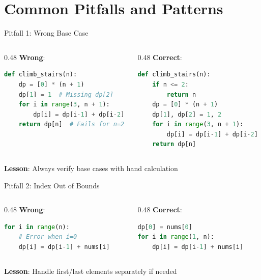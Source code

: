 \documentclass[aspectratio=169]{beamer}
\begin{document}
\section{Common Pitfalls and Patterns}

\begin{frame}[fragile]{Pitfall 1: Wrong Base Case}
\begin{columns}
\begin{column}{0.48\textwidth}
\textbf{Wrong}:
\begin{lstlisting}[language=Python, basicstyle=\ttfamily\tiny]
def climb_stairs(n):
    dp = [0] * (n + 1)
    dp[1] = 1  # Missing dp[2]
    for i in range(3, n + 1):
        dp[i] = dp[i-1] + dp[i-2]
    return dp[n]  # Fails for n=2
\end{lstlisting}
\end{column}

\begin{column}{0.48\textwidth}
\textbf{Correct}:
\begin{lstlisting}[language=Python, basicstyle=\ttfamily\tiny]
def climb_stairs(n):
    if n <= 2:
        return n
    dp = [0] * (n + 1)
    dp[1], dp[2] = 1, 2
    for i in range(3, n + 1):
        dp[i] = dp[i-1] + dp[i-2]
    return dp[n]
\end{lstlisting}
\end{column}
\end{columns}

\vspace{0.5cm}

\textbf{Lesson}: Always verify base cases with hand calculation
\end{frame}

\begin{frame}[fragile]{Pitfall 2: Index Out of Bounds}
\begin{columns}
\begin{column}{0.48\textwidth}
\textbf{Wrong}:
\begin{lstlisting}[language=Python, basicstyle=\ttfamily\tiny]
for i in range(n):
    # Error when i=0
    dp[i] = dp[i-1] + nums[i]
\end{lstlisting}
\end{column}

\begin{column}{0.48\textwidth}
\textbf{Correct}:
\begin{lstlisting}[language=Python, basicstyle=\ttfamily\tiny]
dp[0] = nums[0]
for i in range(1, n):
    dp[i] = dp[i-1] + nums[i]
\end{lstlisting}
\end{column}
\end{columns}

\vspace{0.5cm}

\textbf{Lesson}: Handle first/last elements separately if needed
\end{frame}
\end{document}
